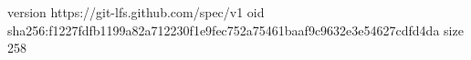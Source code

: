 version https://git-lfs.github.com/spec/v1
oid sha256:f1227fdfb1199a82a712230f1e9fec752a75461baaf9c9632e3e54627cdfd4da
size 258
